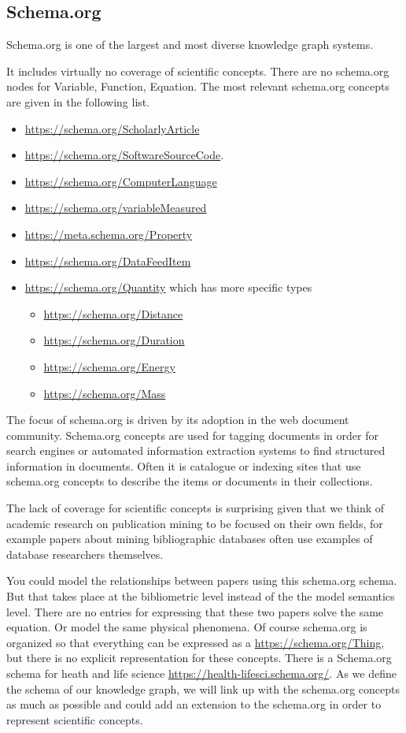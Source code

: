 \documentclass{article}
\newcommand{\schemaorg}[1]{\url{https://schema.org/#1}}
\newcommand{\metaschemaorg}[1]{\url{https://meta.schema.org/#1}}
\providecommand{\tightlist}{%
  \setlength{\itemsep}{0pt}\setlength{\parskip}{0pt}}
\begin{document}
\subsection{Schema.org}
Schema.org is one of the largest and most diverse knowledge graph systems.

It includes virtually no coverage of scientific concepts. There are no schema.org nodes for Variable, Function, Equation. The most relevant schema.org concepts are given in the following list.
\begin{itemize}
\tightlist
  \item \schemaorg{ScholarlyArticle}
  \item \schemaorg{SoftwareSourceCode}. 
  \item \schemaorg{ComputerLanguage}
  \item \schemaorg{variableMeasured}
  \item \metaschemaorg{Property}
  \item \schemaorg{DataFeedItem}
  \item \schemaorg{Quantity} which has more specific types 
  \begin{itemize}
    \item \schemaorg{Distance}
    \item \schemaorg{Duration}
    \item \schemaorg{Energy}
    \item \schemaorg{Mass}
  \end{itemize}
\end{itemize}

The focus of schema.org is driven by its adoption in the web document community. Schema.org concepts are used for tagging documents in order for search engines or automated information extraction systems to find structured information in documents. Often it is catalogue or indexing sites that use schema.org concepts to describe the items or documents in their collections.

The lack of coverage for scientific concepts is surprising given that we think of academic research on publication mining to be focused on their own fields, for example papers about mining bibliographic databases often use examples of database researchers themselves.

You could model the relationships between papers using this schema.org schema. But that takes place at the bibliometric level instead of the the model semantics level. There are no entries for expressing that these two papers solve the same equation. Or model the same physical phenomena. Of course schema.org is organized so that everything can be expressed as a \schemaorg{Thing}, but there is no explicit representation for these concepts. There is a Schema.org schema for heath and life science \url{https://health-lifesci.schema.org/}. As we define the schema of our knowledge graph, we will link up with the schema.org concepts as much as possible and could add an extension to the schema.org in order to represent scientific concepts.
\end{document}
